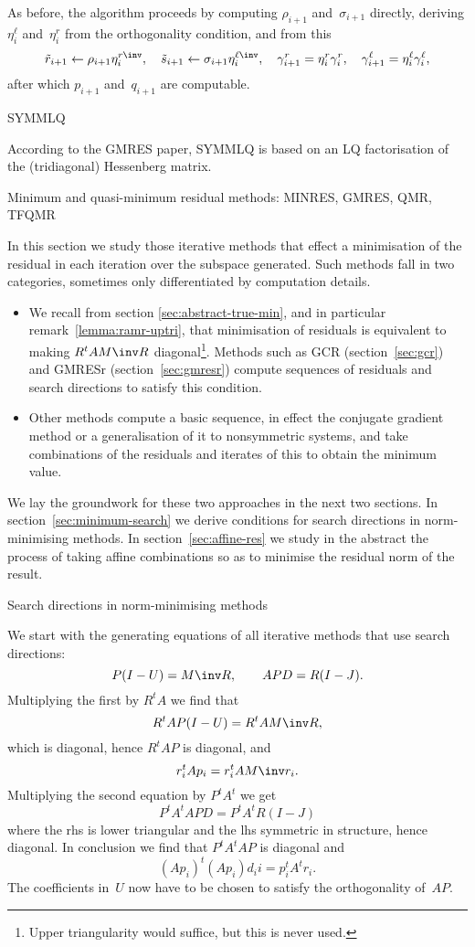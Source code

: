 \documentclass[11pt]{artikel3}
\begin{document}
\begin{Outline}
As before, the algorithm proceeds by computing
$\rho_{i+1}$ and~$\sigma_{i+1}$ directly,
deriving $\eta^\ell_i$ and~$\eta^r_i$ from the 
orthogonality condition,
and from this
\[ \tilde r_{i+1}\leftarrow\rho_{i+1}\eta^{r\inv}_i,\quad
    \tilde s_{i+1}\leftarrow\sigma_{i+1}\eta^{\ell\inv}_i,\quad
    \gr_{i+1}=\eta^r_i\gr_i,\quad \gl_{i+1}=\eta^\ell_i\gl_i,\]
after which $p_{i+1}$ and~$q_{i+1}$ are computable.

 {SYMMLQ}

According to the GMRES paper, SYMMLQ is based on an LQ factorisation
of the (tridiagonal) Hessenberg matrix.

 {Minimum and quasi-minimum residual methods:
MINRES, GMRES, QMR, TFQMR}
\label{sec:resmin}

In this section we study those iterative methods that effect a
minimisation of the residual in each iteration over the subspace
generated. Such methods fall in two categories, sometimes only
differentiated by computation details.
\begin{itemize}
\item We recall from section \ref{sec:abstract-true-min}, and in
particular remark~\ref{lemma:ramr-uptri}, that minimisation of
residuals is equivalent to making $R^tAM\inv R$ diagonal\footnote
{Upper triangularity would suffice, but this is never used.}.
Methods such as GCR (section~\ref{sec:gcr}) and
GMRESr (section~\ref{sec:gmresr}) compute sequences of residuals and
search directions to satisfy this condition.
\item Other methods compute a basic sequence, in effect the conjugate
gradient method or a generalisation of it to nonsymmetric systems, and
take combinations of the residuals and iterates of this to obtain the
minimum value.
\end{itemize}

We lay the groundwork for these two approaches in the next two
sections. In section~\ref{sec:minimum-search} we derive conditions for
search directions in norm-minimising methods. In
section~\ref{sec:affine-res} we study in the abstract the process of
taking affine combinations so as to minimise the residual norm of the
result.

 {Search directions in norm-minimising methods}
\label{sec:minimum-search}

We start with the generating equations of all iterative methods that
use search directions: \[P(I-U)=M\inv R,\qquad APD=R(I-J). \]
Multiplying the first by $R^tA$ we find that
\[ R^tAP(I-U)=R^tAM\inv R, \]
which is diagonal, hence $R^tAP$ is diagonal, and
\[ r_i^tAp_i=r_i^tAM\inv r_i.\]
Multiplying the second equation by $P^tA^t$ we get
\[ P^tA^tAPD=P^tA^tR(I-J) \] where the rhs is lower triangular and the
lhs symmetric in structure, hence diagonal. In conclusion we find that
$P^tA^tAP$ is diagonal and \[ (Ap_i)^t(Ap_i)d_ii=p_i^tA^tr_i. \]
The coefficients in~$U$ now have to be chosen to satisfy the
orthogonality of~$AP$.


\end{Outline}
\end{document}
